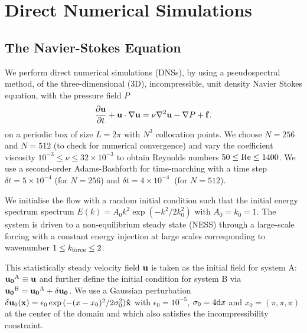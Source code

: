 \documentclass[amsmath,amssymb,amsbsy,pre,twocolumn,tightenlines,superscriptaddress,floatfix]{revtex4-2}
\begin{document}


\appendix
\onecolumngrid

\section{Direct Numerical Simulations}
\label{App_DNS}

\renewcommand{\theequation}{A-\arabic{equation}}
\setcounter{equation}{0}

\subsection{The Navier-Stokes Equation}

We perform direct numerical simulations (DNSs), by using a pseudospectral method, of the three-dimensional (3D),
incompressible, unit density Navier Stokes equation, with the pressure field $P$
\begin{equation}
	\frac{\partial {\bf u}}{\partial t} + {\bf u}\cdot\nabla {\bf u} = \nu \nabla^2 {\bf u} - \nabla P + {\bf f}.
\label{eq:NS}
\end{equation}
on a periodic box of size $L = 2\pi$ with $N^3$ collocation points. We choose $N = 256$ and $N = 512$ (to check for numerical
convergence) and vary the coefficient viscosity $10^{-3}\le \nu \le 32\times10^{-3}$ to obtain Reynolds numbers $ 50 \le {\rm Re} \le 1400 $.
We use a second-order
Adams-Bashforth for time-marching with a time step $\delta t = 5  \times 10^{-4} $ (for $N = 256$) and
$\delta t = 4\times 10^{-4} \ $ (for $N = 512$).

We initialise the flow with a random initial condition such that the
initial energy spectrum spectrum $E(k) = A_0 k^2 \exp(-k^2 / 2k_0^2)$ with $A_0
= k_0 = 1$. The system is driven to a non-equilibrium steady state (NESS)
through a large-scale forcing with a constant energy injection at large scales
corresponding to wavenumber $1 \le k_{\rm force}\le 2$.

This statistically steady velocity field ${\bf u}$ is taken as the initial field for system A: ${\bf u_0}^{\rm A}
\equiv {\bf u}$ and further define the initial condition for system B via ${\bf u_0}^{\rm B} = {\bf u_0}^{\rm A} +
\delta {\bf u_0}$. We use a Gaussian perturbation
$\delta {\bf u}_0 ({\bf x}) = \epsilon_0 \exp{(-(x - x_0)^2 / 2\sigma_0^2)}{\bf \hat{x}}$ with $\epsilon_0 = 10^{-5}$, $\sigma_0=4{\rm d}x $ and $x_0 = ({\pi, \pi, \pi})$ at the center of the domain and which also satisfies the incompressibility constraint.
\end{document}
